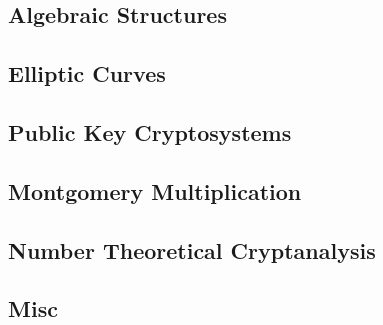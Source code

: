 \documentclass[twoside, 11pt]{article}
\begin{document}
        \subsection*{Algebraic Structures}

        \subsection*{Elliptic Curves}

        \subsection*{Public Key Cryptosystems}

        \subsection*{Montgomery Multiplication}

        \subsection*{Number Theoretical Cryptanalysis}

        \subsection*{Misc}
\end{document}
